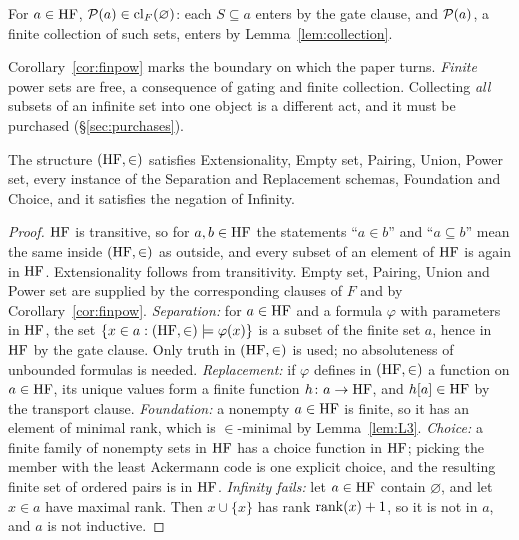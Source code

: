 \begin{corollary}\label{cor:finpow}
For $a\in\mathrm{HF}$, $\mathcal{P}(a)\in\operatorname{cl}_F(\varnothing)$: each $S\subseteq a$ enters by the gate clause,
and $\mathcal{P}(a)$, a finite collection of such sets, enters by Lemma~\ref{lem:collection}.
\end{corollary}

\noindent Corollary~\ref{cor:finpow} marks the boundary on which the paper turns. \emph{Finite}
power sets are free, a consequence of gating and finite collection. Collecting \emph{all}
subsets of an infinite set into one object is a different act, and it must be purchased
(\S\ref{sec:purchases}).

\begin{theorem}\label{thm:hfsat}
The structure $(\mathrm{HF},\in)$ satisfies Extensionality, Empty set, Pairing, Union, Power set, every
instance of the Separation and Replacement schemas, Foundation and Choice, and it satisfies the
negation of Infinity.
\end{theorem}

\begin{proof}
$\mathrm{HF}$ is transitive, so for $a,b\in\mathrm{HF}$ the statements ``$a\in b$'' and ``$a\subseteq b$'' mean
the same inside $(\mathrm{HF},\in)$ as outside, and every subset of an element of $\mathrm{HF}$ is again in
$\mathrm{HF}$. Extensionality follows from transitivity. Empty set, Pairing, Union and Power set are
supplied by the corresponding clauses of $F$ and by Corollary~\ref{cor:finpow}.
\emph{Separation:} for $a\in\mathrm{HF}$ and a formula $\varphi$ with parameters in $\mathrm{HF}$, the set
$\{x\in a:(\mathrm{HF},\in)\models\varphi(x)\}$ is a subset of the finite set $a$, hence in $\mathrm{HF}$ by the
gate clause. Only truth in $(\mathrm{HF},\in)$ is used; no absoluteness of unbounded formulas is needed.
\emph{Replacement:} if $\varphi$ defines in $(\mathrm{HF},\in)$ a function on $a\in\mathrm{HF}$, its unique values
form a finite function $h\colon a\to\mathrm{HF}$, and $h[a]\in\mathrm{HF}$ by the transport clause.
\emph{Foundation:} a nonempty $a\in\mathrm{HF}$ is finite, so it has an element of minimal rank, which is
$\in$-minimal by Lemma~\ref{lem:L3}. \emph{Choice:} a finite family of nonempty sets in $\mathrm{HF}$ has
a choice function in $\mathrm{HF}$; picking the member with the least Ackermann code is one explicit
choice, and the resulting finite set of ordered pairs is in $\mathrm{HF}$. \emph{Infinity fails:} let
$a\in\mathrm{HF}$ contain $\varnothing$, and let $x\in a$ have maximal rank. Then $x\cup\{x\}$ has rank
$\operatorname{rank}(x)+1$, so it is not in $a$, and $a$ is not inductive.
\end{proof}

